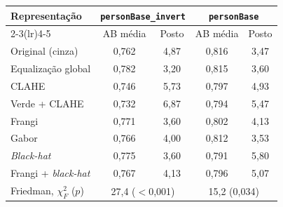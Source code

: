 \begin{tabular}{lcccc}
\toprule
\multirow{2}{*}{Representação} & \multicolumn{2}{c}{\texttt{personBase\_invert}} & \multicolumn{2}{c}{\texttt{personBase}} \\
\cmidrule(lr){2-3}\cmidrule(lr){4-5}
 & AB média & Posto & AB média & Posto \\
\midrule
Original (cinza) & 0,762 & 4,87 & 0,816 & 3,47 \\
Equalização global & 0,782 & 3,20 & 0,815 & 3,60 \\
CLAHE & 0,746 & 5,73 & 0,797 & 4,93 \\
Verde + CLAHE & 0,732 & 6,87 & 0,794 & 5,47 \\
\midrule
Frangi & 0,771 & 3,60 & 0,802 & 4,13 \\
Gabor & 0,766 & 4,00 & 0,812 & 3,53 \\
\textit{Black-hat} & 0,775 & 3,60 & 0,791 & 5,80 \\
Frangi + \textit{black-hat} & 0,767 & 4,13 & 0,796 & 5,07 \\
\midrule
Friedman, $\chi^2_F$ ($p$) & \multicolumn{2}{c}{27,4 ($<$0,001)} & \multicolumn{2}{c}{15,2 (0,034)} \\
\bottomrule
\end{tabular}
